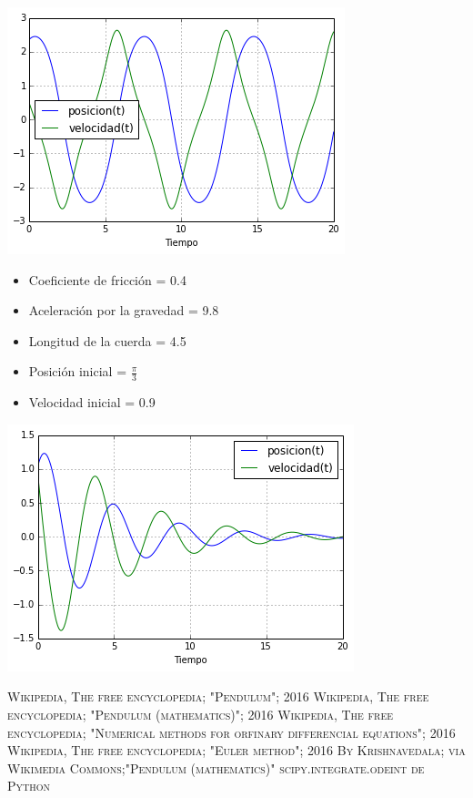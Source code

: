 \documentclass[12pt]{article}
\begin{document}
\includegraphics{5c.png}
\pagebreak
\begin{itemize}
\item Coeficiente de fricción = 0.4
\item Aceleración por la gravedad = 9.8
\item Longitud de la cuerda = 4.5
\item Posición inicial = $\frac{\pi}{3}$
\item Velocidad inicial = 0.9
\end{itemize}
\includegraphics{5d.png}
\pagebreak
\begin{thebibliography}{X}
  \textsc{Wikipedia, The free encyclopedia; "Pendulum"; 2016}
  \textsc{Wikipedia, The free encyclopedia; "Pendulum (mathematics)"; 2016}
  \textsc{Wikipedia, The free encyclopedia; "Numerical methods for orfinary differencial equations"; 2016}
  \textsc{Wikipedia, The free encyclopedia; "Euler method"; 2016}
  \textsc{By Krishnavedala; via Wikimedia Commons;"Pendulum (mathematics)"}
  \textsc{scipy.integrate.odeint de Python}
\end{thebibliography}
\end{document}
